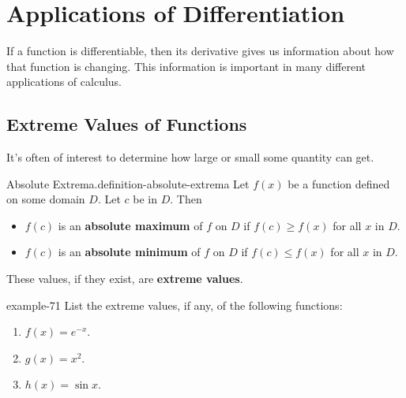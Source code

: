 \documentclass[10pt,]{book}
\newcommand{\terminology}[1]{\textbf{#1}}
\numberwithin{equation}{section}
\begin{document}
\chapter[{Applications of Differentiation}]{Applications of Differentiation}\label{applications-differentiation}
\begin{introduction}{}%
\hypertarget{p-308}{}%
If a function is differentiable, then its derivative gives us information about how that function is changing. This information is important in many different applications of calculus.%
\end{introduction}%
%
%
\typeout{************************************************}
\typeout{************************************************}
%
\section[{Extreme Values of Functions}]{Extreme Values of Functions}\label{section-extreme-values-of-functions}
\hypertarget{p-309}{}%
It's often of interest to determine how large or small some quantity can get.%
\begin{definition}{Absolute Extrema.}{definition-absolute-extrema}%
\hypertarget{p-310}{}%
Let \(f(x)\) be a function defined on some domain \(D\). Let \(c\) be in \(D\). Then \leavevmode%
\begin{itemize}[label=\textbullet]
\item{}\(f(c)\) is an \terminology{absolute maximum} of \(f\) on \(D\) if \(f(c)\geq f(x)\) for all \(x\) in \(D\).%
\item{}\(f(c)\) is an \terminology{absolute minimum} of \(f\) on \(D\) if \(f(c)\leq f(x)\) for all \(x\) in \(D\).%
\end{itemize}
 These values, if they exist, are \terminology{extreme values}.%
\end{definition}
\begin{example}{}{example-71}%
\hypertarget{p-311}{}%
List the extreme values, if any, of the following functions: \leavevmode%
\begin{enumerate}
\item\hypertarget{li-19}{}\(f(x) = e^{-x}\).%
\item\hypertarget{li-20}{}\(g(x) = x^{2}\).%
\item\hypertarget{li-21}{}\(h(x) = \sin x\).%
\end{enumerate}
%
\end{example}
\hypertarget{p-312}{}%
\end{document}
